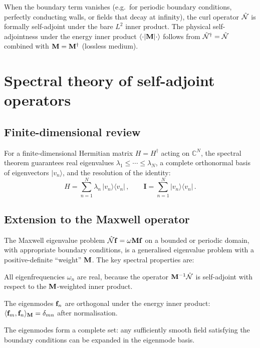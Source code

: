 When the boundary term vanishes (e.g.\ for periodic boundary conditions,
perfectly conducting walls, or fields that decay at infinity), the
curl operator $\hat{\mathcal{N}}$ is formally self-adjoint under the bare $L^2$
inner product.  The physical self-adjointness under the energy inner
product $\langle\cdot|\mathbf{M}|\cdot\rangle$ follows from
$\hat{\mathcal{N}}^\dagger=\hat{\mathcal{N}}$ combined with $\mathbf{M}=\mathbf{M}^\dagger$
(lossless medium).

\section{Spectral theory of self-adjoint operators}
\label{sec:appA-spectral}

\subsection{Finite-dimensional review}
\label{sec:appA-finite}

For a finite-dimensional Hermitian matrix $H=H^\dagger$ acting on \cite{raman2010photonic}
$\mathbb{C}^N$, the spectral theorem guarantees real eigenvalues
$\lambda_1\leq\cdots\leq\lambda_N$, a complete orthonormal basis of
eigenvectors $|v_n\rangle$, and the resolution of the identity:
\begin{equation}\label{eq:appA-spectral-finite}
  H = \sum_{n=1}^N\lambda_n\,|v_n\rangle\langle v_n|\,,
  \qquad
  \mathbf{I} = \sum_{n=1}^N|v_n\rangle\langle v_n|\,.
\end{equation}

\subsection{Extension to the Maxwell operator}
\label{sec:appA-maxwell-spectral}

The Maxwell eigenvalue problem
$\hat{\mathcal{N}}\mathbf{f}=\omega\mathbf{M}\mathbf{f}$ on a bounded or periodic
domain, with appropriate boundary conditions, is a generalised
eigenvalue problem with a positive-definite ``weight'' $\mathbf{M}$.  The
key spectral properties are:

All eigenfrequencies $\omega_n$ are real, because the operator
$\mathbf{M}^{-1}\hat{\mathcal{N}}$ is self-adjoint with respect to the
$\mathbf{M}$-weighted inner product.

The eigenmodes $\mathbf{f}_n$ are orthogonal under the energy inner
product: $\langle \mathbf{f}_m , \mathbf{f}_n \rangle_{\mathbf{M}}=\delta_{mn}$ after
normalisation.

The eigenmodes form a complete set: any sufficiently smooth field
satisfying the boundary conditions can be expanded in the eigenmode
basis.


